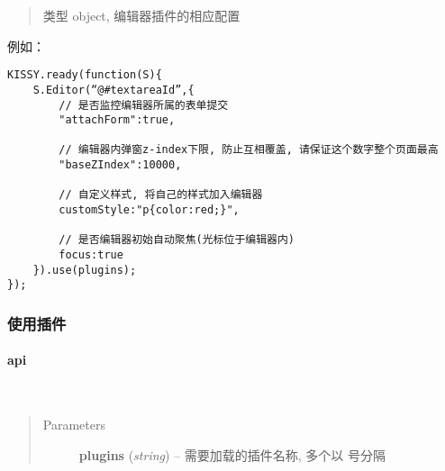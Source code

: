 \documentclass[letterpaper,10pt,english]{sphinxmanual}
\begin{document}
\begin{fulllineitems}
\begin{quote}
\begin{description}
\begin{itemize}
\begin{fulllineitems}
\end{fulllineitems}



\begin{fulllineitems}
\label{relatedproj/editorguide/usage:Editor.KISSY.Editor.config.pluginConfig}
类型 object, 编辑器插件的相应配置

\end{fulllineitems}



\end{itemize}

\end{description}\end{quote}

\end{fulllineitems}


例如：

\begin{Verbatim}[commandchars=@\[\]]
KISSY.ready(function(S){
    S.Editor(“@#textareaId”,{
        // 是否监控编辑器所属的表单提交
        "attachForm":true,

        // 编辑器内弹窗z-index下限, 防止互相覆盖, 请保证这个数字整个页面最高
        "baseZIndex":10000,

        // 自定义样式, 将自己的样式加入编辑器
        customStyle:"p{color:red;}",

        // 是否编辑器初始自动聚焦(光标位于编辑器内)
        focus:true
    }).use(plugins);
});
\end{Verbatim}


\subsubsection{使用插件}
\label{relatedproj/editorguide/usage:id2}

\paragraph{api}
\label{relatedproj/editorguide/plugin-api:api}\label{relatedproj/editorguide/plugin-api::doc}

\begin{fulllineitems}
\label{relatedproj/editorguide/plugin-api:Editor.KISSY.Editor.use}~\begin{quote}\begin{description}
\item[{Parameters}] \leavevmode
\textbf{plugins} (\emph{string}) -- 需要加载的插件名称, 多个以 \code{,} 号分隔

\end{description}\end{quote}

\end{fulllineitems}
\end{document}
